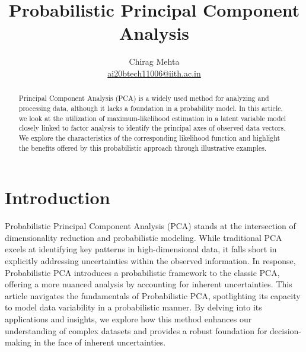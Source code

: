 \documentclass[10pt,onecolumn,letterpaper]{article}
\title{Probabilistic Principal Component Analysis}
\begin{document}
\author{Chirag Mehta \\ \href{mailto:ai20btech11006@iith.ac.in}{ai20btech11006@iith.ac.in}}

\maketitle


\begin{abstract}
    Principal Component Analysis (PCA) is a widely used method for analyzing and processing data, although it lacks a foundation in a probability model. In this article, we look at the utilization of maximum-likelihood estimation in a latent variable model closely linked to factor analysis to identify the principal axes of observed data vectors. We explore the characteristics of the corresponding likelihood function and highlight the benefits offered by this probabilistic approach through illustrative examples.
\end{abstract}

\thispagestyle{fancy}


\section{Introduction}

Probabilistic Principal Component Analysis (PCA) stands at the intersection of dimensionality reduction and probabilistic modeling. While traditional PCA excels at identifying key patterns in high-dimensional data, it falls short in explicitly addressing uncertainties within the observed information. In response, Probabilistic PCA introduces a probabilistic framework to the classic PCA, offering a more nuanced analysis by accounting for inherent uncertainties. This article navigates the fundamentals of Probabilistic PCA, spotlighting its capacity to model data variability in a probabilistic manner. By delving into its applications and insights, we explore how this method enhances our understanding of complex datasets and provides a robust foundation for decision-making in the face of inherent uncertainties.
\end{document}
